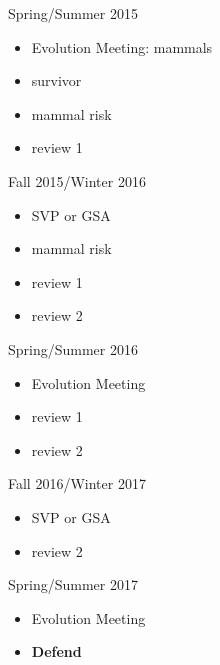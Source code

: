 \documentclass[12pt,letterpaper]{article}
\begin{document}
Spring/Summer 2015
\begin{itemize}
  \item Evolution Meeting: mammals
  \item survivor
  \item mammal risk
  \item review 1
\end{itemize}

Fall 2015/Winter 2016
\begin{itemize}
  \item SVP or GSA
  \item mammal risk
  \item review 1
  \item review 2
\end{itemize}

Spring/Summer 2016
\begin{itemize}
  \item Evolution Meeting
  \item review 1
  \item review 2
\end{itemize}

Fall 2016/Winter 2017
\begin{itemize}
  \item SVP or GSA
  \item review 2
\end{itemize}

Spring/Summer 2017
\begin{itemize}
  \item Evolution Meeting
  \item \textbf{Defend}
\end{itemize}



\clearpage


\end{document}
